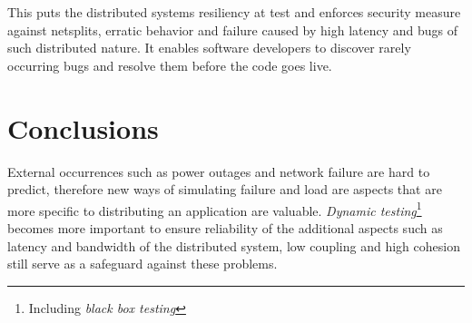 \documentclass[10pt]{sensys-abstract}
\begin{document}
This puts the distributed systems resiliency at test and enforces security measure against netsplits, erratic behavior and failure caused by high latency and bugs of such distributed nature. It enables software developers to discover rarely occurring bugs and resolve them before the code goes live.

\section{Conclusions}
\noindent

External occurrences such as power outages and network failure are hard to predict, therefore new ways of simulating failure and load are aspects that are more specific to distributing an application are valuable. \emph{Dynamic testing}\footnote{Including \emph{black box testing}} becomes more important to ensure reliability of the additional aspects such as latency and bandwidth of the distributed system, low coupling and high cohesion still serve as a safeguard against these problems.

\newpage
%

%
%

\balancecolumns
\end{document}
